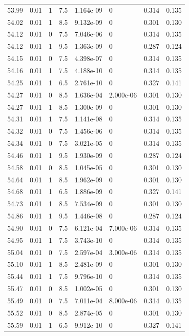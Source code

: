 \documentclass[preview]{standalone}
\begin{document}
{{{{{{{{{{{{{{{{\begin{tabular}{L{1.2cm}C{1.2cm} C{0.3cm}C{0.5cm} C{1.4cm}C{1.4cm} C{1.4cm}C{1.4cm}}
  53.99  &  0.01  & 1     & 7.5 &  1.164e-09  & 0  & 0.314 &  0.135   \\ 
  54.02  &  0.01  & 1     & 8.5 &  9.132e-09  & 0  & 0.301 &  0.130   \\ 
  54.12  &  0.01  & 0     & 7.5 &  7.046e-06  & 0  & 0.314 &  0.135   \\ 
  54.12  &  0.01  & 1     & 9.5 &  1.363e-09  & 0  & 0.287 &  0.124   \\ 
  54.15  &  0.01  & 0     & 7.5 &  4.398e-07  & 0  & 0.314 &  0.135   \\ 
  54.16  &  0.01  & 1     & 7.5 &  4.188e-10  & 0  & 0.314 &  0.135   \\ 
  54.25  &  0.01  & 1     & 6.5 &  2.761e-10  & 0  & 0.327 &  0.141   \\ 
  54.27  &  0.01  & 0     & 8.5 &  1.636e-04  & 2.000e-06  & 0.301 &  0.130   \\ 
  54.27  &  0.01  & 1     & 8.5 &  1.300e-09  & 0  & 0.301 &  0.130   \\ 
  54.31  &  0.01  & 1     & 7.5 &  1.141e-08  & 0  & 0.314 &  0.135   \\ 
  54.32  &  0.01  & 0     & 7.5 &  1.456e-06  & 0  & 0.314 &  0.135   \\ 
  54.34  &  0.01  & 0     & 7.5 &  3.021e-05  & 0  & 0.314 &  0.135   \\ 
  54.46  &  0.01  & 1     & 9.5 &  1.930e-09  & 0  & 0.287 &  0.124   \\ 
  54.58  &  0.01  & 0     & 8.5 &  1.045e-05  & 0  & 0.301 &  0.130   \\ 
  54.64  &  0.01  & 1     & 8.5 &  1.962e-09  & 0  & 0.301 &  0.130   \\ 
  54.68  &  0.01  & 1     & 6.5 &  1.886e-09  & 0  & 0.327 &  0.141   \\ 
  54.73  &  0.01  & 1     & 8.5 &  7.534e-09  & 0  & 0.301 &  0.130   \\ 
  54.86  &  0.01  & 1     & 9.5 &  1.446e-08  & 0  & 0.287 &  0.124   \\ 
  54.90  &  0.01  & 0     & 7.5 &  6.121e-04  & 7.000e-06  & 0.314 &  0.135   \\ 
  54.95  &  0.01  & 1     & 7.5 &  3.743e-10  & 0  & 0.314 &  0.135   \\ 
  55.04  &  0.01  & 0     & 7.5 &  2.597e-04  & 3.000e-06  & 0.314 &  0.135   \\ 
  55.10  &  0.01  & 1     & 8.5 &  2.481e-09  & 0  & 0.301 &  0.130   \\ 
  55.44  &  0.01  & 1     & 7.5 &  9.796e-10  & 0  & 0.314 &  0.135   \\ 
  55.47  &  0.01  & 0     & 8.5 &  1.002e-05  & 0  & 0.301 &  0.130   \\ 
  55.49  &  0.01  & 0     & 7.5 &  7.011e-04  & 8.000e-06  & 0.314 &  0.135   \\ 
  55.52  &  0.01  & 0     & 8.5 &  2.874e-05  & 0  & 0.301 &  0.130   \\ 
  55.59  &  0.01  & 1     & 6.5 &  9.912e-10  & 0  & 0.327 &  0.141   \\ 
\hline 
\end{tabular} 

}}}}}}}}}}}}}}}}
\end{document}
